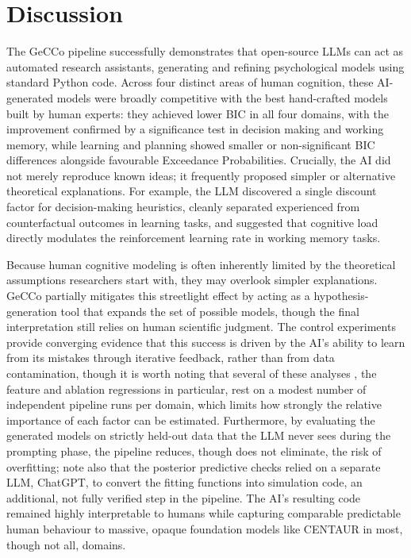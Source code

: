 \section{Discussion}
The GeCCo pipeline successfully demonstrates that open-source LLMs can act as automated research assistants, generating and refining psychological models using standard Python code. Across four distinct areas of human cognition, these AI-generated models were broadly competitive with the best hand-crafted models built by human experts: they achieved lower BIC in all four domains, with the improvement confirmed by a significance test in decision making and working memory, while learning and planning showed smaller or non-significant BIC differences alongside favourable Exceedance Probabilities. Crucially, the AI did not merely reproduce known ideas; it frequently proposed simpler or alternative theoretical explanations. For example, the LLM discovered a single discount factor for decision-making heuristics, cleanly separated experienced from counterfactual outcomes in learning tasks, and suggested that cognitive load directly modulates the reinforcement learning rate in working memory tasks. 

Because human cognitive modeling is often inherently limited by the theoretical assumptions researchers start with, they may overlook simpler explanations. GeCCo partially mitigates this streetlight effect by acting as a hypothesis-generation tool that expands the set of possible models, though the final interpretation still relies on human scientific judgment. The control experiments provide converging evidence that this success is driven by the AI's ability to learn from its mistakes through iterative feedback, rather than from data contamination, though it is worth noting that several of these analyses , the feature and ablation regressions in particular, rest on a modest number of independent pipeline runs per domain, which limits how strongly the relative importance of each factor can be estimated. Furthermore, by evaluating the generated models on strictly held-out data that the LLM never sees during the prompting phase, the pipeline reduces, though does not eliminate, the risk of overfitting; note also that the posterior predictive checks relied on a separate LLM, ChatGPT, to convert the fitting functions into simulation code, an additional, not fully verified step in the pipeline. The AI's resulting code remained highly interpretable to humans while capturing comparable predictable human behaviour to massive, opaque foundation models like CENTAUR in most, though not all, domains.

